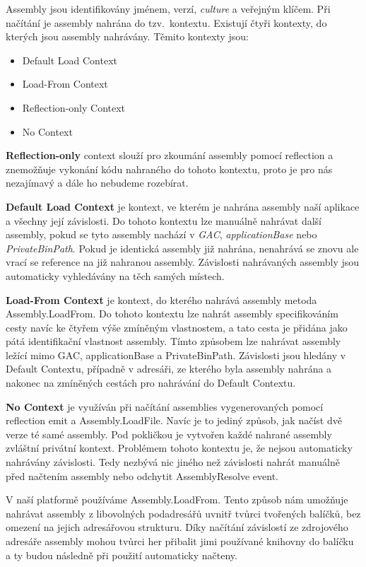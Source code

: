 Assembly jsou identifikovány jménem, verzí, \textit{culture} a veřejným klíčem. 
Při načítání je assembly nahrána do tzv.~kontextu. Existují čtyři kontexty, do kterých jsou assembly nahrávány. Těmito kontexty jsou\citep{site:assemblyload}:
\begin{itemize}
	\item Default Load Context
	\item Load-From Context
	\item Reflection-only Context
	\item No Context
\end{itemize}

\textbf{Reflection-only} context slouží pro zkoumání assembly pomocí reflection a znemožňuje vykonání kódu nahraného do tohoto kontextu, proto je pro nás nezajímavý a dále ho nebudeme rozebírat.

\textbf{Default Load Context} je kontext, ve kterém je nahrána assembly naší aplikace a všechny její závislosti. Do tohoto kontextu lze manuálně nahrávat další assembly, pokud se tyto assembly nachází v \emph{GAC}, \emph{applicationBase} nebo \emph{PrivateBinPath}. Pokud je identická assembly již nahrána, nenahrává se znovu ale vrací se reference na již nahranou assembly. Závislosti nahrávaných assembly jsou automaticky vyhledávány na těch samých místech.

\textbf{Load-From Context} je kontext, do kterého nahrává assembly metoda Assembly.LoadFrom. Do tohoto kontextu lze nahrát assembly specifikováním cesty navíc ke čtyřem výše zmíněným vlastnostem, a tato cesta je přidána jako pátá identifikační vlastnost assembly. Tímto způsobem lze nahrávat assembly ležící mimo GAC, applicationBase a PrivateBinPath. Závislosti jsou hledány v Default Contextu, případně v adresáři, ze kterého byla assembly nahrána a nakonec na zmíněných cestách pro nahrávání do Default Contextu.

\textbf{No Context} je využíván při načítání  assemblies vygenerovaných pomocí reflection emit a Assembly.LoadFile. Navíc je to jediný způsob, jak načíst dvě verze té samé assembly. Pod pokličkou je vytvořen každé nahrané assembly zvláštní privátní kontext. Problémem tohoto kontextu je, že nejsou automaticky nahrávány závislosti. Tedy nezbývá nic jiného než závislosti nahrát manuálně před načtením assembly nebo odchytit AssemblyResolve event.

V naší platformě používáme Assembly.LoadFrom. Tento způsob nám umožňuje nahrávat assembly z libovolných podadresářů uvnitř tvůrci tvořených balíčků, bez omezení na jejich adresářovou strukturu. Díky načítání závislostí ze zdrojového adresáře assembly mohou tvůrci her přibalit jimi používané knihovny do balíčku a ty budou následně při použití automaticky načteny.

